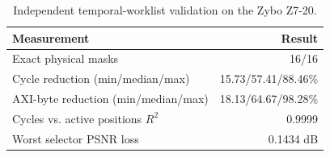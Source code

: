 \begin{table}[t]
\centering
\caption{Independent temporal-worklist validation on the Zybo Z7-20.}
\label{tab:sparse-independent-worklists}
\begin{tabular}{lr}
\hline
Measurement & Result \\
\hline
Exact physical masks & 16/16 \\
Cycle reduction (min/median/max) & 15.73/57.41/88.46\% \\
AXI-byte reduction (min/median/max) & 18.13/64.67/98.28\% \\
Cycles vs. active positions $R^2$ & 0.9999 \\
Worst selector PSNR loss & 0.1434 dB \\
\hline
\end{tabular}
\end{table}
